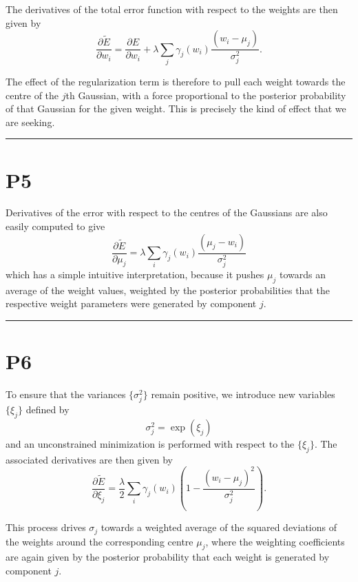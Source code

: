 \documentclass{article}
\begin{document}
The derivatives of the total error function with respect to the weights are then given by
\begin{equation}
\frac{\partial \widetilde{E}}{\partial w_i} = \frac{\partial E}{\partial w_i} + \lambda \sum_j \gamma_j(w_i) \frac{(w_i - \mu_j)}{\sigma_j^2}.
\tag{9.25}
\end{equation}

The effect of the regularization term is therefore to pull each weight towards the centre of the $j$th Gaussian, with a force proportional to the posterior probability of that Gaussian for the given weight. This is precisely the kind of effect that we are seeking.

\noindent\rule{\linewidth}{0.4pt}

\section{P5}

Derivatives of the error with respect to the centres of the Gaussians are also easily computed to give
\begin{equation}
\frac{\partial \widetilde{E}}{\partial \mu_j} = \lambda \sum_i \gamma_j(w_i) \frac{(\mu_j - w_i)}{\sigma_j^2}
\tag{9.26}
\end{equation}
which has a simple intuitive interpretation, because it pushes $\mu_j$ towards an average of the weight values, weighted by the posterior probabilities that the respective weight parameters were generated by component $j$.

\noindent\rule{\linewidth}{0.4pt}

\section{P6}

To ensure that the variances $\{\sigma_j^2\}$ remain positive, we introduce new variables $\{\xi_j\}$ defined by
\begin{equation}
\sigma_j^2 = \exp(\xi_j)
\tag{9.27}
\end{equation}
and an unconstrained minimization is performed with respect to the $\{\xi_j\}$. The associated derivatives are then given by
\begin{equation}
\frac{\partial \widetilde{E}}{\partial \xi_j} = \frac{\lambda}{2} \sum_i \gamma_j(w_i) \left( 1 - \frac{(w_i - \mu_j)^2}{\sigma_j^2} \right).
\tag{9.28}
\end{equation}

This process drives $\sigma_j$ towards a weighted average of the squared deviations of the weights around the corresponding centre $\mu_j$, where the weighting coefficients are again given by the posterior probability that each weight is generated by component $j$.
\end{document}
